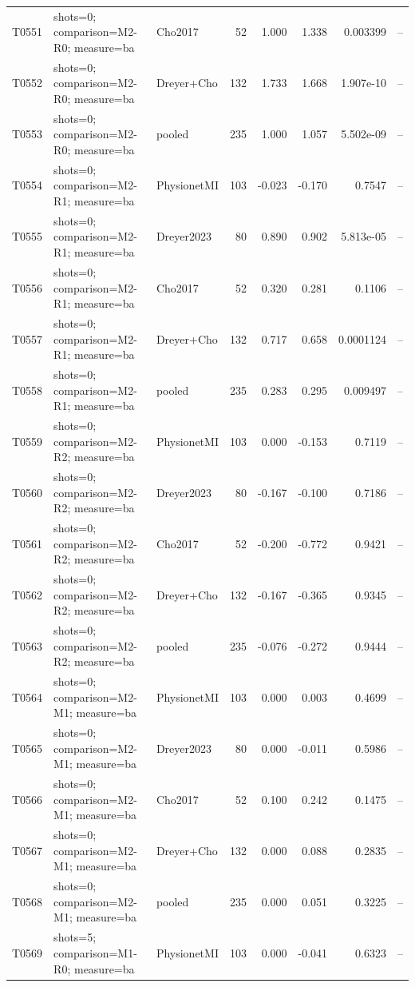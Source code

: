 \begin{longtable}{p{.45in}p{2.6in}p{.75in}rrrrr}
T0551 & shots=0; comparison=M2-R0; measure=ba & Cho2017 & 52 & 1.000 & 1.338 & 0.003399 & -- \\
T0552 & shots=0; comparison=M2-R0; measure=ba & Dreyer+Cho & 132 & 1.733 & 1.668 & 1.907e-10 & -- \\
T0553 & shots=0; comparison=M2-R0; measure=ba & pooled & 235 & 1.000 & 1.057 & 5.502e-09 & -- \\
T0554 & shots=0; comparison=M2-R1; measure=ba & PhysionetMI & 103 & -0.023 & -0.170 & 0.7547 & -- \\
T0555 & shots=0; comparison=M2-R1; measure=ba & Dreyer2023 & 80 & 0.890 & 0.902 & 5.813e-05 & -- \\
T0556 & shots=0; comparison=M2-R1; measure=ba & Cho2017 & 52 & 0.320 & 0.281 & 0.1106 & -- \\
T0557 & shots=0; comparison=M2-R1; measure=ba & Dreyer+Cho & 132 & 0.717 & 0.658 & 0.0001124 & -- \\
T0558 & shots=0; comparison=M2-R1; measure=ba & pooled & 235 & 0.283 & 0.295 & 0.009497 & -- \\
T0559 & shots=0; comparison=M2-R2; measure=ba & PhysionetMI & 103 & 0.000 & -0.153 & 0.7119 & -- \\
T0560 & shots=0; comparison=M2-R2; measure=ba & Dreyer2023 & 80 & -0.167 & -0.100 & 0.7186 & -- \\
T0561 & shots=0; comparison=M2-R2; measure=ba & Cho2017 & 52 & -0.200 & -0.772 & 0.9421 & -- \\
T0562 & shots=0; comparison=M2-R2; measure=ba & Dreyer+Cho & 132 & -0.167 & -0.365 & 0.9345 & -- \\
T0563 & shots=0; comparison=M2-R2; measure=ba & pooled & 235 & -0.076 & -0.272 & 0.9444 & -- \\
T0564 & shots=0; comparison=M2-M1; measure=ba & PhysionetMI & 103 & 0.000 & 0.003 & 0.4699 & -- \\
T0565 & shots=0; comparison=M2-M1; measure=ba & Dreyer2023 & 80 & 0.000 & -0.011 & 0.5986 & -- \\
T0566 & shots=0; comparison=M2-M1; measure=ba & Cho2017 & 52 & 0.100 & 0.242 & 0.1475 & -- \\
T0567 & shots=0; comparison=M2-M1; measure=ba & Dreyer+Cho & 132 & 0.000 & 0.088 & 0.2835 & -- \\
T0568 & shots=0; comparison=M2-M1; measure=ba & pooled & 235 & 0.000 & 0.051 & 0.3225 & -- \\
T0569 & shots=5; comparison=M1-R0; measure=ba & PhysionetMI & 103 & 0.000 & -0.041 & 0.6323 & -- \\

\end{longtable}
